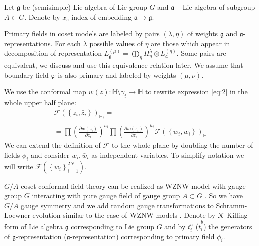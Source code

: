 \documentclass{jetpl}
\newcommand{\gf}{\mathfrak{g}}
\newcommand{\af}{\mathfrak{a}}
\begin{document}
Let $\gf$ be (semisimple) Lie algebra of Lie group $G$ and $\af$ -- Lie algebra of subgroup $A\subset G$. Denote by $x_{e}$ index of embedding $\af\to\gf$. 

Primary fields in coset models are labeled by pairs $(\lambda,\eta)$ of weights $\gf$ and $\af$-representations. For each $\lambda$ possible values of $\eta$ are those which appear in decomposition of representation $L^{(\mu)}_{\gf}=\bigoplus_{\eta} H^{\lambda}_{\eta}\otimes L^{(\eta)}_{\af}$. Some pairs are equivalent, we discuss and use this equivalence relation later. 
We assume that boundary field $\varphi$ is also primary and labeled by weights $(\mu,\nu)$.

  We use the conformal map  $w(z):\mathbb{H}\setminus\gamma_{t}\to \mathbb{H}$ to rewrite expression \eqref{eq:2} in the whole upper half plane:
\begin{multline}
  \mathcal{F}(\left\{z_{i},\bar z_{i}\right\})_{\mathbb{H}_{t}}=\\
  =\prod \left(\frac{\partial w(z_{i})}{\partial z_{i}}\right)^{h_{i}} 
  \prod \left(\frac{\partial \bar w(\bar z_{i})}{\partial \bar z_{i}}\right)^{\bar h_i}
  \mathcal{F}(\left\{w_{i}, \bar w_{i}\right\})_{\mathbb{H}}
  \label{eq:1}
\end{multline}
We can extend the definition of $\mathcal{F}$ to the whole plane by doubling the number of fields $\phi_{i}$ \cite{cardy2004boundary,cardy1984conformal} and consider $w_{i},\bar w_{i}$ as independent variables. To simplify notation we will write $\mathcal{F}(\left\{w_{i}\right\}_{i=1}^{2N})$.


$G/A$-coset conformal field theory can be realized as WZNW-model with gauge group $G$ interacting with pure gauge field of gauge group $A\subset G$ \cite{gawdzki1988g,figueroa89equivalence}. So we have $G/A$ gauge symmetry and we add random gauge transformations to Schramm-Loewner evolution \cite{2011arXiv1112.4354N} similar to the case of WZNW-models \cite{bettelheim2005stochastic}. Denote by $\mathcal{K}$ Killing form of Lie algebra $\gf$ corresponding to Lie group $G$ and by $t^{a}_{i}$ ($\tilde{t}^{b}_{i}$) the  generators of $\gf$-representation ($\af$-representation) corresponding to primary field $\phi_{i}$.
\end{document}
